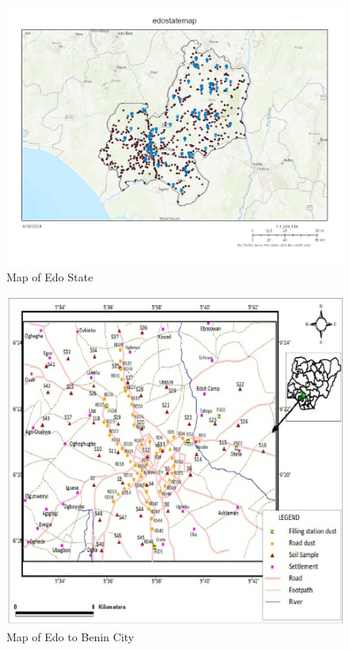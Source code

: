 \begin{figure}[H]
    \centering
    \includegraphics[width=1\linewidth]{edostate_updated.jpg}
    \caption{Map of Edo State}
    \label{fig:edostatemap}
\end{figure}
\vspace{1cm}
\begin{figure}[H]
    \centering
    \includegraphics[width=1\linewidth]{edobenin.png}
    \caption{Map of Edo to Benin City}
    \label{fig:edobeninstatemap}
\end{figure}



